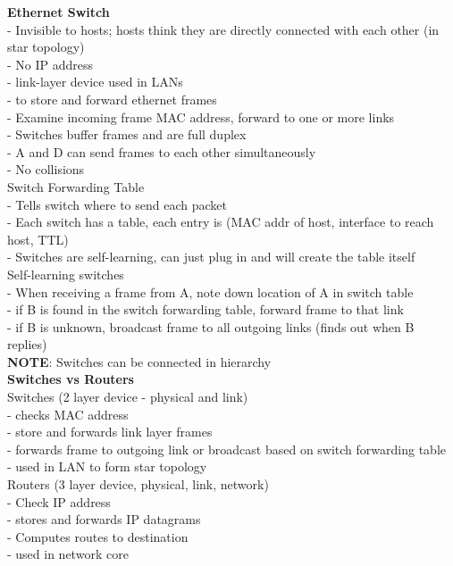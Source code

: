 \documentclass[10pt, a4paper]{article}
\newcommand{\highlight}[1]{{\color{red}\textbf{#1}}}
\newcommand{\red}[1]{{\color{red}#1}}
\newcommand{\green}[1]{{\color{ForestGreen}#1}}
\newcommand{\tab}[0]{\hspace*{2mm}}
\begin{document}
\begin{multicols*}{3}
		\textbf{Ethernet Switch}\\
		- \red{Invisible to hosts}; hosts think they are directly connected with each other (in star topology)\\
		\tab - No IP address\\
		- link-layer device used in LANs\\
		\tab - to store and forward ethernet frames\\
		\tab - Examine incoming frame MAC address, forward to one or more links\\
		- Switches buffer frames and are full duplex\\
		\tab - A and D can send frames to each other \red{simultaneously}\\
		- No collisions\\

		Switch Forwarding Table\\
		- Tells switch where to send each packet\\
		- Each switch has a table, each entry is (MAC addr of host, interface to reach host, TTL)\\
		- Switches are self-learning, can just plug in and will create the table itself\\

		Self-learning switches\\
		- When receiving a frame from A, note down location of A in switch table\\
		- if B is \green{found} in the switch forwarding table, forward frame to that link\\
		- if B is \red{unknown}, broadcast frame to \red{all outgoing links} (finds out when B replies)\\
		\highlight{NOTE}: Switches can be connected in hierarchy\\

		\textbf{Switches vs Routers}\\

		Switches (2 layer device - physical and link)\\
		- checks \red{MAC} address\\
		- store and forwards \red{link layer} frames\\
		- forwards frame to outgoing link or broadcast based on switch forwarding table\\
		- used in LAN to form star topology\\

		Routers (3 layer device, physical, link, network)\\
		- Check \red{IP} address\\
		- stores and forwards \red{IP} datagrams\\
		- Computes routes to destination\\
		- used in network core\\


















		

		
		
	\end{multicols*}
\end{document}
